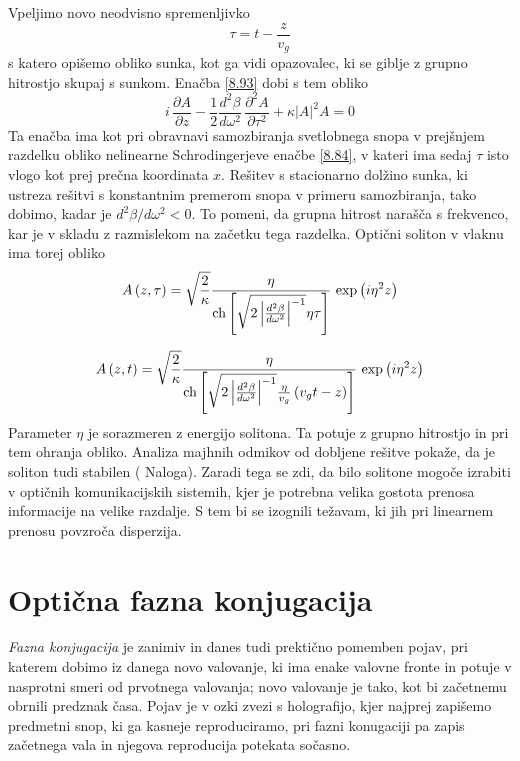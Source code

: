 Vpeljimo novo neodvisno spremenljivko 
\begin{equation}
\tau=t-\frac{z}{v_{g}}
\end{equation}
 s katero opišemo obliko sunka, kot ga vidi opazovalec, ki se giblje
z grupno hitrostjo skupaj s sunkom. Enačba \ref{8.93} dobi s tem
obliko 
\begin{equation}
i\,\frac{\partial A}{\partial z}-\frac{1}{2}\frac{d^{2}\beta}{d\omega^{2}}\,\frac{\partial^{2}A}{\partial\tau^{2}}+\kappa\left|A\right|^{2}A=0\label{8.95}
\end{equation}
 Ta enačba ima kot pri obravnavi samozbiranja svetlobnega snopa v
prejšnjem razdelku obliko nelinearne Schrodingerjeve enačbe \ref{8.84},
v kateri ima sedaj $\tau$ isto vlogo kot prej prečna koordinata $x$.
Rešitev s stacionarno dolžino sunka, ki ustreza rešitvi s konstantnim
premerom snopa v primeru samozbiranja, tako dobimo, kadar je $d^{2}\beta/d\omega^{2}<0$.
To pomeni, da grupna hitrost narašča s frekvenco, kar je v skladu
z razmislekom na začetku tega razdelka. Optični soliton v vlaknu ima
torej obliko 
\[
A\left(z,\tau\right)=\sqrt{\frac{2}{\kappa}}\frac{\eta}{{\rm ch}\left[\sqrt{2\left|\frac{d^{2}\beta}{d\omega^{2}}\right|^{-1}}\eta\tau\right]}\,\exp\left(i\eta^{2}z\right)
\]
 
\begin{equation}
A\left(z,t\right)=\sqrt{\frac{2}{\kappa}}\frac{\eta}{{\rm ch}\left[\sqrt{2\left|\frac{d^{2}\beta}{d\omega^{2}}\right|^{-1}}\frac{\eta}{v_{g}}\left(v_{g}t-z\right)\right]}\,\exp\left(i\eta^{2}z\right)\label{8.96}
\end{equation}
 Parameter $\eta$ je sorazmeren z energijo solitona. Ta potuje z
grupno hitrostjo in pri tem ohranja obliko. Analiza majhnih odmikov
od dobljene rešitve pokaže, da je soliton tudi stabilen ( Naloga).
Zaradi tega se zdi, da bilo solitone mogoče izrabiti v optičnih komunikacijskih
sistemih, kjer je potrebna velika gostota prenosa informacije na velike
razdalje. S tem bi se izognili težavam, ki jih pri linearnem prenosu
povzroča disperzija.


\section{Optična fazna konjugacija}

\textit{Fazna konjugacija} je zanimiv in danes tudi prektično pomemben
pojav, pri katerem dobimo iz danega novo valovanje, ki ima enake valovne
fronte in potuje v nasprotni smeri od prvotnega valovanja; novo valovanje
je tako, kot bi začetnemu obrnili predznak časa. Pojav je v ozki zvezi
s holografijo, kjer najprej zapišemo predmetni snop, ki ga kasneje
reproduciramo, pri fazni konugaciji pa zapis začetnega vala in njegova
reproducija potekata sočasno.

